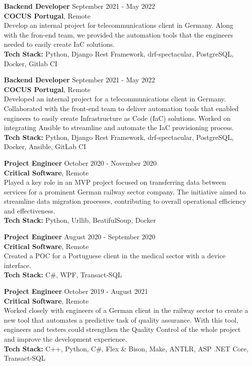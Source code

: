\documentclass[margin, 10pt]{res} %
\begin{document}
\begin{resume}
    \textbf{Backend Developer} \hfill September 2021 - May 2022\\
    \textbf{COCUS Portugal}, Remote\\
    Develop an internal project for telecommunications client in Germany. Along with the fron-end team, we provided the automation tools that the engineers needed to easily create IaC solutions.\\
    \textbf {Tech Stack:} Python, Django Rest Framework, drf-spectacular, PostgreSQL, Docker, Gitlab CI


    \textbf{Backend Developer} \hfill September 2021 - May 2022\\
    \textbf{COCUS Portugal}, Remote\\
    Developed an internal project for a telecommunications client in Germany. Collaborated with the front-end team to deliver automation tools that enabled engineers to easily create Infrastructure as Code (IaC) solutions. Worked on integrating Ansible to streamline and automate the IaC provisioning process.\\
    \textbf{Tech Stack:} Python, Django Rest Framework, drf-spectacular, PostgreSQL, Docker, Ansible, GitLab CI


    \textbf{Project Engineer} \hfill October 2020 - November 2020\\
    \textbf{Critical Software}, Remote\\
    Played a key role in an MVP project focused on transferring data between services for a prominent German railway sector company. The initiative aimed to streamline data migration processes, contributing to overall operational efficiency and effectiveness.\\
    \textbf {Tech Stack:} Python, Urllib, BeatifulSoup, Docker


    \textbf{Project Engineer} \hfill August 2020 - September 2020\\
    \textbf{Critical Software}, Remote\\
    Created a POC for a Portuguese client in the medical sector with a device interface.\\
    \textbf {Tech Stack:} C\#, WPF, Transact-SQL


    \textbf{Project Engineer} \hfill October 2019 - August 2021\\
    \textbf{Critical Software}, Remote\\
    Worked closely with engineers of a German client in the railway sector to create a new tool that automates a predictive task of quality assurance. With this tool, engineers and testers could strengthen the Quality Control of the whole project and improve the development experience.\\  
    \textbf {Tech Stack:} C++, Python, C\#, Flex \& Bison, Make, ANTLR, ASP .NET Core, Transact-SQL



\end{resume}
\end{document}
